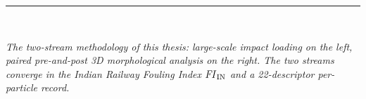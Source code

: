 \begin{center}
\vspace{0.6cm}
{\color{gsvaccent}\rule{0.25\textwidth}{0.4pt}}\\[10pt]
\begin{minipage}{0.78\textwidth}
\centering\itshape\small\color{gsvblue!85!black}
The two-stream methodology of this thesis: large-scale impact loading
on the left, paired pre-and-post 3D morphological analysis on the right.
The two streams converge in the Indian Railway Fouling Index $\mathit{FI}_{\mathrm{IN}}$
and a 22-descriptor per-particle record.\par
\end{minipage}
\end{center}

\vspace*{\fill}
\cleardoublepage

